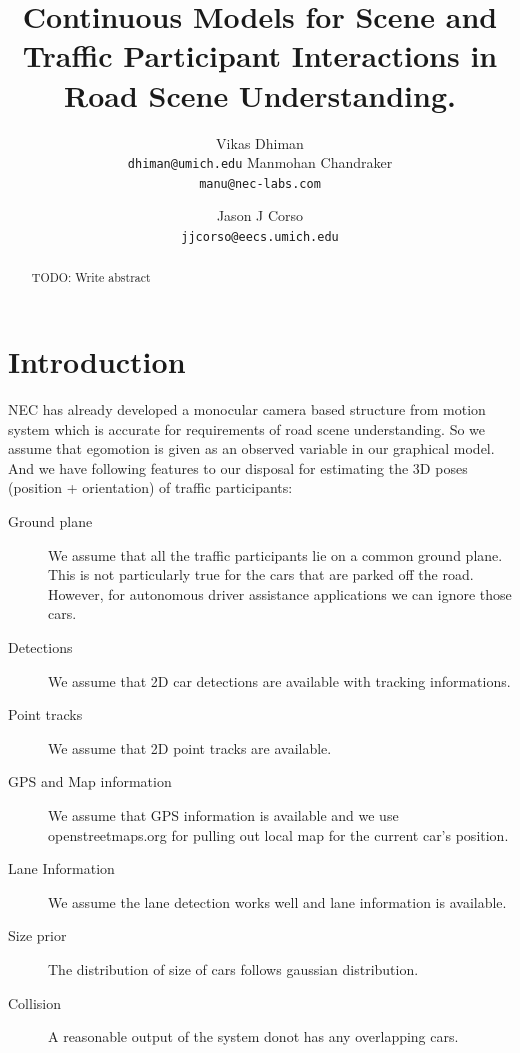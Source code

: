 \documentclass[10pt,twocolumn,letterpaper]{article}
\begin{document}
\title{Continuous Models for Scene and Traffic Participant Interactions in Road Scene Understanding.}
\author{Vikas Dhiman\\
{\tt\small dhiman@umich.edu}
Manmohan Chandraker\\
{\tt\small manu@nec-labs.com}
\and
Jason J Corso\\
{\tt\small jjcorso@eecs.umich.edu}
}
\maketitle

\begin{abstract}
  TODO: Write abstract
\end{abstract}

\section{Introduction}
  NEC has already developed a monocular camera based structure from motion
  system which is accurate for requirements of road scene understanding. So we
  assume that egomotion is given as an observed variable in our graphical
  model. And we have following features to our disposal for estimating the 3D
  poses (position + orientation) of traffic participants:
  \begin{description}
    \item[Ground plane] We assume that all the traffic participants lie on a common ground
      plane. This is not particularly true for the cars that are parked off the
      road. However, for autonomous driver assistance applications we can
      ignore those cars.
    \item[Detections] We assume that 2D car detections are available with tracking informations.
    \item[Point tracks] We assume that 2D point tracks are available.
    \item[GPS and Map information] We assume that GPS information is available
      and we use openstreetmaps.org for pulling out local map for the current
      car's position.
    \item[Lane Information] We assume the lane detection works well and lane
      information is available.
    \item[Size prior] The distribution of size of cars follows gaussian distribution.
    \item[Collision] A reasonable output of the system donot has any overlapping cars.
  \end{description}
\end{document}
